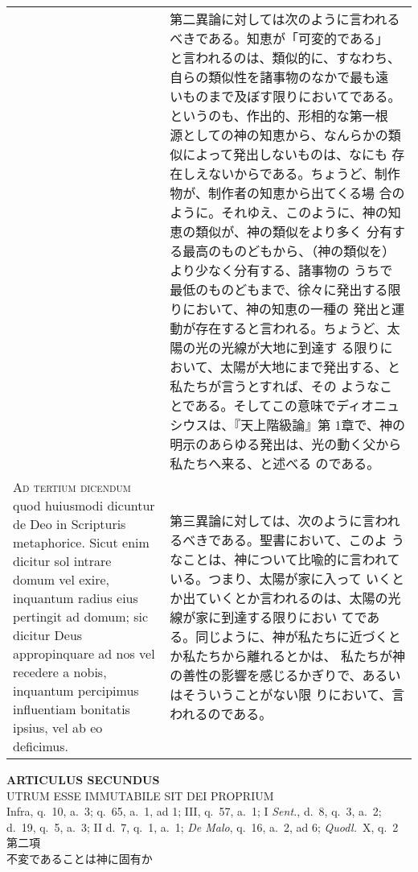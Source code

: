\documentclass[10pt]{jsarticle} %
\begin{document}
\begin{longtable}{p{21em}p{21em}}
&

第二異論に対しては次のように言われるべきである。知恵が「可変的である」
と言われるのは、類似的に、すなわち、自らの類似性を諸事物のなかで最も遠
いものまで及ぼす限りにおいてである。というのも、作出的、形相的な第一根
源としての神の知恵から、なんらかの類似によって発出しないものは、なにも
存在しえないからである。ちょうど、制作物が、制作者の知恵から出てくる場
合のように。それゆえ、このように、神の知恵の類似が、神の類似をより多く
分有する最高のものどもから、（神の類似を）より少なく分有する、諸事物の
うちで最低のものどもまで、徐々に発出する限りにおいて、神の知恵の一種の
発出と運動が存在すると言われる。ちょうど、太陽の光の光線が大地に到達す
る限りにおいて、太陽が大地にまで発出する、と私たちが言うとすれば、その
ようなことである。そしてこの意味でディオニュシウスは、『天上階級論』第
1章で、神の明示のあらゆる発出は、光の動く父から私たちへ来る、と述べる
のである。

\\


{\scshape Ad tertium dicendum} quod huiusmodi dicuntur de Deo in
 Scripturis metaphorice. Sicut enim dicitur sol intrare domum vel exire,
 inquantum radius eius pertingit ad domum; sic dicitur Deus
 appropinquare ad nos vel recedere a nobis, inquantum percipimus
 influentiam bonitatis ipsius, vel ab eo deficimus.

&


第三異論に対しては、次のように言われるべきである。聖書において、このよ
 うなことは、神について比喩的に言われている。つまり、太陽が家に入って
 いくとか出ていくとか言われるのは、太陽の光線が家に到達する限りにおい
 てである。同じように、神が私たちに近づくとか私たちから離れるとかは、
 私たちが神の善性の影響を感じるかぎりで、あるいはそういうことがない限
 りにおいて、言われるのである。


\end{longtable}
\newpage
{}


\begin{center}
 {\Large {\bf ARTICULUS SECUNDUS}}\\
 {\large UTRUM ESSE IMMUTABILE SIT DEI PROPRIUM}\\
 {\footnotesize Infra, q.~10, a.~3; q.~65, a.~1, ad 1; III, q.~57, a.~1;
 I {\itshape Sent.}, d.~8, q.~3, a.~2; d.~19, q.~5, a.~3; II d.~7, q.~1,
 a.~1; {\itshape De Malo}, q.~16, a.~2, ad 6; {\itshape Quodl.}~X, q.~2}\\
 {\Large 第二項\\不変であることは神に固有か}
\end{center}
\end{document}
